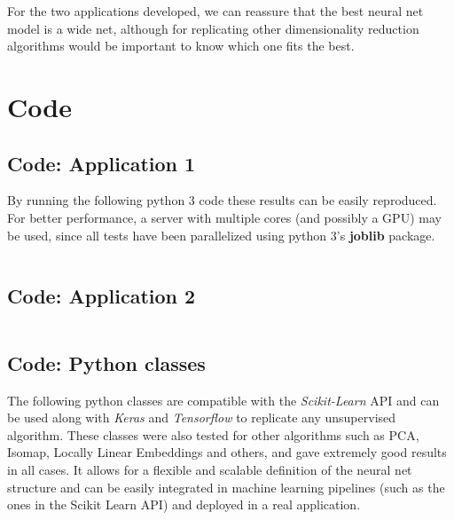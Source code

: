 \documentclass[a4paper,11pt,spanish]{report}
\begin{document}
For the two applications developed, we can reassure that the best neural net model is a wide net, although for replicating other dimensionality reduction algorithms would be important to know which one fits the best.


\chapter{Code}
\label{chap:code}
\nocite{*}

\section{Code: Application 1}
\label{code1}

By running the following python 3 code these results can be easily reproduced. For better performance, a server with multiple cores (and possibly a GPU) may be used, since all tests have been parallelized using python 3's \textbf{joblib} package.

\vspace{10px}
\inputminted[baselinestretch=1, fontsize=\scriptsize, breaklines]{python}{application1.py}
\newpage

\section{Code: Application 2}
\label{code2}

\inputminted[baselinestretch=1, fontsize=\scriptsize, breaklines]{python}{application2.py}
\newpage

\section{Code: Python classes}
\label{codeclasses}

The following python classes are compatible with the \textit{Scikit-Learn} API and can be used along with \textit{Keras} and \textit{Tensorflow} to replicate any unsupervised algorithm. These classes were also tested for other algorithms such as PCA, Isomap, Locally Linear Embeddings and others, and gave extremely good results in all cases. It allows for a flexible and scalable definition of the neural net structure and can be easily integrated in machine learning pipelines (such as the ones in the Scikit Learn API) and deployed in a real application.
\end{document}
